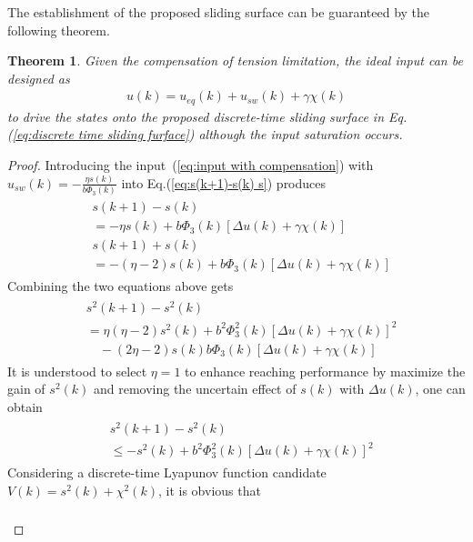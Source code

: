 \documentclass[10pt,final,journal]{IEEEtran}
\newtheorem{mythm}{Theorem}
\begin{document}
The establishment  of the proposed sliding surface can be guaranteed by the following theorem.

\begin{mythm}
Given the compensation of tension limitation, the ideal input can be designed as  
\begin{align}\label{eq:input with compensation}
	u(k) = u_{eq}(k)+u_{sw}(k)+\gamma\chi(k)
\end{align}
to drive the states onto the proposed discrete-time sliding surface in Eq.(\ref{eq:discrete time sliding furface}) although the input saturation occurs.
\end{mythm}
\begin{proof}
Introducing the input~(\ref{eq:input with compensation}) with $u_{sw}(k)=-\frac{\eta s(k)}{b\Phi_3(k)}$ into Eq.(\ref{eq:s(k+1)-s(k) s}) produces
\begin{align}\begin{split}
	&s(k+1)-s(k) \\
	&= -\eta s(k)+b\Phi_3(k)\left[\Delta u(k)+\gamma\chi(k)\right]\\
	&s(k+1)+s(k) \\
	&= -(\eta-2) s(k)+b\Phi_3(k)\left[\Delta u(k)+\gamma\chi(k)\right]
\end{split}\end{align}
Combining the two equations above gets
\begin{align}\begin{split}
	&s^2(k+1)-s^2(k) \\
	&= \eta(\eta-2)s^2(k)+b^2\Phi_3^2(k)\left[\Delta u(k)+\gamma\chi(k)\right]^2\\
	&\quad-(2\eta-2)s(k)b\Phi_3(k)\left[\Delta u(k)+\gamma\chi(k)\right]
\end{split}\end{align}
It is understood to select $\eta=1$ to enhance reaching performance by maximize the gain of $s^2(k)$ and removing the uncertain effect of $s(k)$ with $\Delta u(k)$, one can obtain
\begin{align}\begin{split}
	&s^2(k+1)-s^2(k) \\
	&\le -s^2(k)+b^2\Phi_3^2(k)\left[\Delta u(k)+\gamma\chi(k)\right]^2
\end{split}\end{align}
Considering a discrete-time Lyapunov function candidate $V(k) = s^2(k)+\chi^2(k)$, it is obvious that
\begin{align}\begin{split}\label{eq:V(k+1)-V(k)}

\end{split}
\end{align}
\end{proof}
\end{document}
